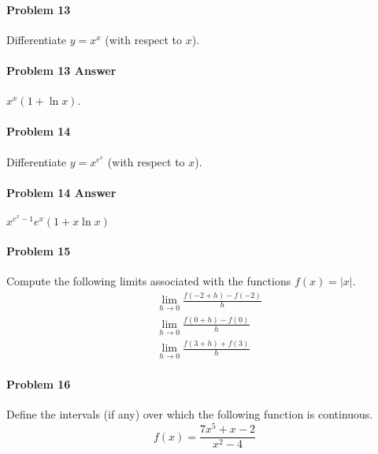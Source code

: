 \documentclass[a4paper, 11pt]{article}
\begin{document}
\paragraph{Problem 13} Differentiate $y = x^x$ (with respect to $x$).


\paragraph{Problem 13 Answer}
$x^{x} (1 + \ln x)$.


\paragraph{Problem 14} Differentiate $y = x^{e^x}$ (with respect to $x$).


\paragraph{Problem 14 Answer} $x^{e^x-1} e^{x} (1 + x \ln x)$


\paragraph{Problem 15} Compute the following limits associated with the functions $f(x) = |x|$.
\begin{align}
    &\lim_{h\rightarrow 0} \frac{f(-2 + h) - f(-2)}{h}  \nonumber \\
    &\lim_{h\rightarrow 0} \frac{f(0 + h) - f(0)}{h} \nonumber \\
    &\lim_{h\rightarrow 0} \frac{f(3 + h) + f(3)}{h} \nonumber
\end{align}

\paragraph{Problem 16}
Define the intervals (if any) over which the following function is continuous.
\[
	f(x) = \frac{7x^5 + x - 2}{x^2-4}
\]
\end{document}
